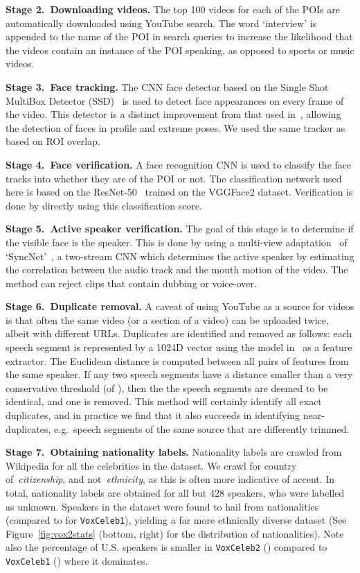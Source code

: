 \documentclass[a4paper]{article}
\def\newpara{\vspace{2pt}}
\begin{document}
\newpara\noindent\textbf{Stage 2.\  Downloading videos.}
The top 100 videos for each of the POIs are automatically downloaded using YouTube search. The word `interview' is appended to the name of the POI in search queries to increase the likelihood that the videos contain an instance of the POI speaking, as opposed to sports or music videos. 

\newpara\noindent\textbf{Stage 3.\  Face tracking.}
The CNN face detector based on the
Single Shot MultiBox Detector (SSD)~\cite{Liu16}
is used to detect face appearances
 on every frame of the video. This detector is a distinct improvement  from that used in~\cite{Nagrani17}, allowing the detection of faces in profile and extreme poses. 
 We used the same tracker as~\cite{Nagrani17} based on ROI overlap.
 
\newpara\noindent\textbf{Stage 4.\  Face verification. }
A face recognition CNN is used to classify the face tracks into whether they are of the POI or not.
The classification network used here is based on the ResNet-50~\cite{He15} trained on the VGGFace2
dataset. Verification is done by directly using this
classification score. 

\newpara\noindent\textbf{Stage 5.\  Active speaker verification.}
The goal of this stage is to determine if the  visible face is the speaker. This is done by using a multi-view adaptation~\cite{Chung17a} of `SyncNet'~\cite{Chung16a,Chung18}, a two-stream CNN which determines the active speaker by estimating the correlation between the audio track and the mouth motion of the video. The method can reject clips that contain dubbing or voice-over. 

\newpara\noindent\textbf{Stage 6.\  Duplicate removal. } 
A caveat of using YouTube as a source for videos is that often the
same video (or a section of a video) can be uploaded twice, albeit
with different URLs. Duplicates are identified and removed as follows:
each speech segment  is represented by a  1024D  vector using
the model in~\cite{Nagrani17} as a feature extractor.
The Euclidean distance is computed between all pairs of 
features from the same speaker. If any two speech segments  have a
distance smaller than a very conservative threshold (of ), then the 
the speech segments are deemed to be identical, and one is removed. This method will certainly
identify all exact duplicates, and in practice we find that it also succeeds in identifying near-duplicates,
e.g.\ speech segments of the same source that are differently trimmed. 

\newpara\noindent\textbf{Stage 7.\  Obtaining nationality labels. } 
Nationality labels are crawled from Wikipedia for all the celebrities
in the dataset. We crawl for country of~\textit{citizenship}, and
not~\textit{ethnicity}, as this is often more indicative of accent. In
total,  nationality labels are obtained for all but 428 speakers, who
were labelled as unknown. Speakers in the dataset were found to hail
from  nationalities (compared to  for { \tt VoxCeleb1}),
yielding a far more ethnically diverse dataset (See
Figure~\ref{fig:vox2stats} (bottom, right) for the distribution of
nationalities). Note also the percentage of U.S. speakers is smaller in
{ \tt VoxCeleb2} () compared to { \tt VoxCeleb1} () where
it dominates. 
\end{document}
